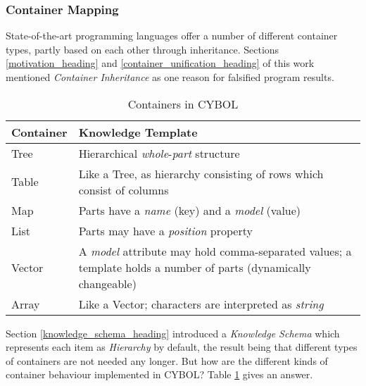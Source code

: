 %
%
%
%
%
%
%

\subsubsection{Container Mapping}
\label{container_mapping_heading}

State-of-the-art programming languages offer a number of different container
types, partly based on each other through inheritance. Sections
\ref{motivation_heading} and \ref{container_unification_heading} of this work
mentioned \emph{Container Inheritance} as one reason for falsified program
results.

\begin{table}[ht]
    \begin{center}
        \begin{tabular}{| p{15mm} | p{35mm} |}
            \hline
            \textbf{Container} & \textbf{Knowledge Template}\\
            \hline
            Tree & Hierarchical \emph{whole}-\emph{part} structure\\
            \hline
            Table & Like a Tree, as hierarchy consisting of rows which consist of columns\\
            \hline
            Map & Parts have a \emph{name} (key) and a \emph{model} (value)\\
            \hline
            List & Parts may have a \emph{position} property\\
            \hline
            Vector & A \emph{model} attribute may hold comma-separated values;
                a template holds a number of parts (dynamically changeable)\\
            \hline
            Array & Like a Vector; characters are interpreted as \emph{string}\\
            \hline
        \end{tabular}
        \caption{Containers in CYBOL}
        \label{mapping_table}
    \end{center}
\end{table}

Section \ref{knowledge_schema_heading} introduced a \emph{Knowledge Schema}
which represents each item as \emph{Hierarchy} by default, the result being
that different types of containers are not needed any longer. But how are the
different kinds of container behaviour implemented in CYBOL? Table
\ref{mapping_table} gives an answer.
